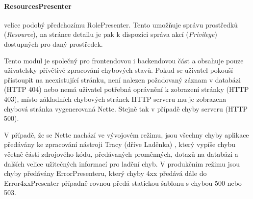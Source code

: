 \paragraph{ResourcesPresenter} velice podobý předchozímu RolePresenter. Tento umožňuje správu prostředků (\textit{Resource}), na stránce detailu je pak k dispozici správa akcí (\textit{Privilege}) dostupných pro daný prostředek.

Tento modul je společný pro frontendovou i backendovou část a obsahuje pouze uživatelsky přívětivé zpracování chybových stavů. Pokud se uživatel pokouší přistoupit na neexistující stránku, není nalezen požadovaný záznam v databázi (HTTP 404) nebo nemá uživatel potřebná oprávnění k zobrazení stránky (HTTP 403), místo základních chybových stránek HTTP serveru mu je zobrazena chybová stránka vygenerovaná Nette. Stejně tak v případě chyby serveru (HTTP 500). 

V případě, že se Nette nachází ve vývojovém režimu, jsou všechny chyby aplikace předávány ke zpracování nástroji Tracy (dříve Laděnka) \cite{Tracy}, který vypíše chybu včetně části zdrojového kódu, předávaných proměnných, dotazů na databázi a dalších velice užitečných informací pro ladění chyb. V produkčním režimu jsou chyby předávány ErrorPresenteru, který chyby 4xx předává dále do Error4xxPresenter případně rovnou předá statickou šablonu s chybou 500 nebo 503.

